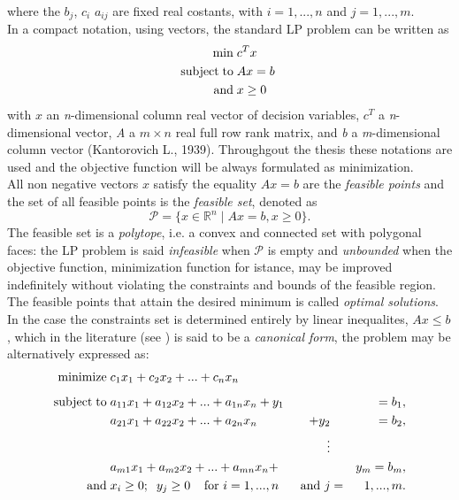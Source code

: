 \documentclass[a4paper,10 pt,titlepage,twoside]{report}
\theoremstyle{plain}
\theoremstyle{definition}
\theoremstyle{remark}
\begin{document}
where the $b_{j}$, $c_{i}$  $a_{ij}$ are fixed real costants, with $i=1,...,n$ and $j=1,...,m$.\\ In a compact notation, using vectors, the standard LP problem can be written as
\begin{equation}\label{(Prim)}
 \begin{split}
\min\;&c^{T}x\\
\text{subject\;to\;}&Ax= b\;\\\text{and\;}&x\geq0
 \end{split}
\end{equation}
with $x$ an \textit{n}-dimensional column real vector of decision variables, $c^
{T}$ a \textit{n}-dimensional vector, \textit{A} a $m \times n$ real full row rank matrix, and \textit{b} a \textit{m}-dimensional column vector (Kantorovich L., 1939).
Throughgout the thesis these notations are used and the objective function will be always formulated as minimization.\\
All non negative vectors $x$ satisfy the equality $Ax = b$ are the \textit{feasible points} and the set of all feasible points is the \textit{feasible set}, denoted as \begin{equation}\label{PP}
\mathcal{P}=\lbrace x\in\mathbb{R}^{n}\; |\; Ax = b , x \geq0\rbrace.
\end{equation} The feasible set is a \textit{polytope}, i.e. a convex and connected set with polygonal faces: the LP problem is said \textit{infeasible} when $\mathcal{P}$ is empty and \textit{unbounded} when the objective function, minimization function for istance, may be improved indefinitely without violating the constraints and bounds of the feasible region.\\The feasible points that attain the desired minimum is
called \textit{optimal solutions}.\\
In the case the constraints set is determined entirely by linear inequalites, $Ax \leq b$, which in the literature (see \cite{W}) is said to be a \textit{canonical form}, the problem may be alternatively expressed as:
\begin{alignat*}{3}
\text{minimize\;}&c_1 x_1 + c_2 x_2+ ...+c_n x_n&&&\\[1.8mm]
\text{subject\;to\;}&a_{11} x_1 +a_{12}x_2 + ... +a_{1n}x_n +y_{1}&&&= b_1,\\
		   	&a_{21}x_1+a_{22}x_2+ ... +a_{2n}x_n&+y_{2}&&= b_2,\\
&&\;\;\;\vdots&&\\
&a_{m1}x_1+a_{m2}x_2+ ... +a_{mn}x_n+&&&y_{m}=b_m,\\
\text{and} \;& x_{i} \geq 0;\;\; y_{j} \geq 0 \text{\;\;\;\;for }i = 1,...,n&\text{ and }j&=&1,...,m.
\end{alignat*}
\end{document}
